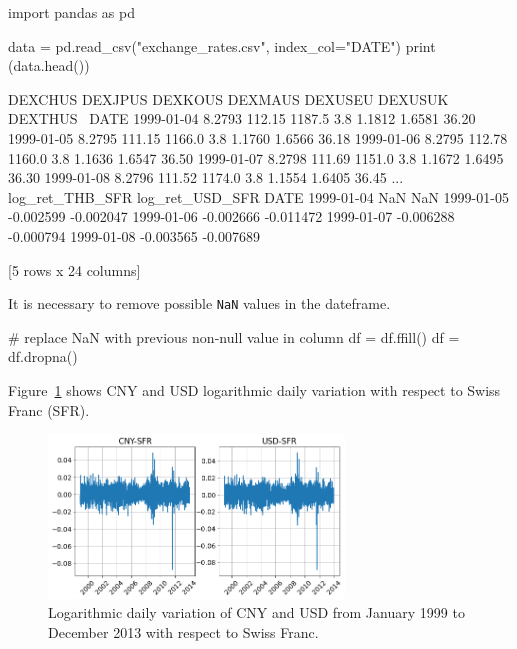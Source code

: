 \begin{ipython}
import pandas as pd

data = pd.read_csv("exchange_rates.csv", index_col="DATE")
print (data.head())
\end{ipython}
\begin{ioutput}
            DEXCHUS  DEXJPUS  DEXKOUS  DEXMAUS  DEXUSEU  DEXUSUK  DEXTHUS  \
DATE                                                                        
1999-01-04   8.2793   112.15   1187.5      3.8   1.1812   1.6581    36.20   
1999-01-05   8.2795   111.15   1166.0      3.8   1.1760   1.6566    36.18   
1999-01-06   8.2795   112.78   1160.0      3.8   1.1636   1.6547    36.50   
1999-01-07   8.2798   111.69   1151.0      3.8   1.1672   1.6495    36.30   
1999-01-08   8.2796   111.52   1174.0      3.8   1.1554   1.6405    36.45   
...
            log_ret_THB_SFR  log_ret_USD_SFR  
DATE                                          
1999-01-04              NaN              NaN  
1999-01-05        -0.002599        -0.002047  
1999-01-06        -0.002666        -0.011472  
1999-01-07        -0.006288        -0.000794  
1999-01-08        -0.003565        -0.007689  

[5 rows x 24 columns]
\end{ioutput}
\noindent
It is necessary to remove possible \texttt{NaN} values in the dateframe.

\begin{ipython}
# replace NaN with previous non-null value in column
df = df.ffill()
df = df.dropna()
\end{ipython}

Figure~\ref{fig:rate_variation} shows CNY and USD logarithmic daily variation with respect to Swiss Franc (SFR).
\begin{figure}[htbp]
\centering
\includegraphics[width=0.7\textwidth]{figures/log_variation_exch}
\caption{Logarithmic daily variation of CNY and USD from January 1999 to December 2013 with respect to Swiss Franc.}
\label{fig:rate_variation}
\end{figure}

